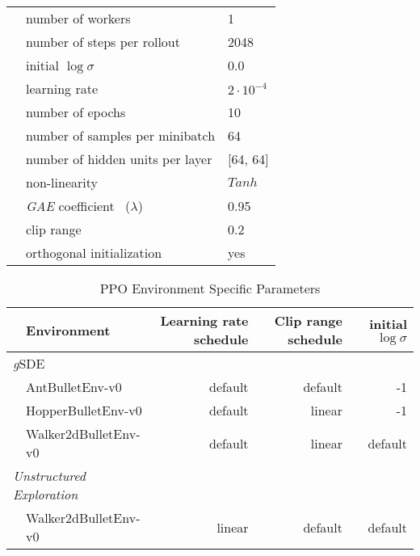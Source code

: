 \documentclass{article}
\newcommand{\ourSDE}{\textit{g}\textsc{SDE}\xspace}
\newcommand{\ppo}{\textsc{PPO}\xspace}
\begin{document}
\begin{table}[h]
\begin{tabular}{@{}l l| l@{}}
    & number of workers &  1\\
    & number of steps per rollout & 2048\\
    & initial $\log \sigma$ & 0.0\\
    & learning rate & $2 \cdot 10^{-4}$\\
    & number of epochs & 10\\
    & number of samples per minibatch & 64\\
    & number of hidden units per layer & [64, 64]\\
    & non-linearity & $Tanh$\\
    & \textit{GAE} coefficient~\citep{schulman2015high} ($\lambda$) &  0.95\\
    & clip range & 0.2 \\
    & orthogonal initialization~\citep{engstrom2020implementation} & yes \\

    \bottomrule
  \end{tabular}
\end{table}


\begin{table}[h]
\renewcommand{\arraystretch}{1.1}
\centering
\caption{\ppo Environment Specific Parameters}
\label{tab:env_params}
\vspace{1mm}
  \begin{tabular}{@{}l l r r r@{}}
    \toprule
    & Environment 	& Learning rate schedule & Clip range schedule & initial $\log \sigma$\\
    \midrule
    \multicolumn{2}{l}{\ourSDE}& \\
      & AntBulletEnv-v0 & default & default & -1\\
      & HopperBulletEnv-v0 & default & linear & -1\\
      & Walker2dBulletEnv-v0 & default & linear & default\\
    \midrule
    \multicolumn{2}{l}{\textit{Unstructured Exploration}}& \\
      & Walker2dBulletEnv-v0 & linear & default & default\\
    \bottomrule
  \end{tabular}
\end{table}


 
\end{document}
